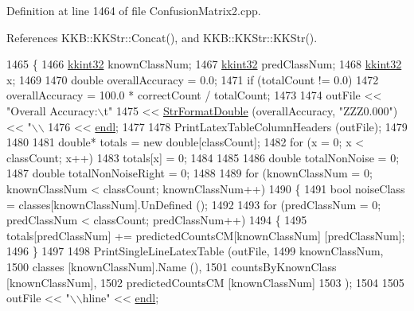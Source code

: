 Definition at line 1464 of file Confusion\+Matrix2.\+cpp.



References K\+K\+B\+::\+K\+K\+Str\+::\+Concat(), and K\+K\+B\+::\+K\+K\+Str\+::\+K\+K\+Str().


\begin{DoxyCode}
1465 \{
1466   \hyperlink{namespace_k_k_b_a8fa4952cc84fda1de4bec1fbdd8d5b1b}{kkint32} knownClassNum;
1467   \hyperlink{namespace_k_k_b_a8fa4952cc84fda1de4bec1fbdd8d5b1b}{kkint32} predClassNum;
1468   \hyperlink{namespace_k_k_b_a8fa4952cc84fda1de4bec1fbdd8d5b1b}{kkint32} x;
1469 
1470   \textcolor{keywordtype}{double}  overallAccuracy = 0.0;
1471   \textcolor{keywordflow}{if}  (totalCount != 0.0)
1472     overallAccuracy = 100.0 * correctCount / totalCount;
1473 
1474   outFile  << \textcolor{stringliteral}{"Overall Accuracy:\(\backslash\)t"} 
1475            << \hyperlink{namespace_k_k_b_a1a40a40e955fa5417a7cdd990e0021b1}{StrFormatDouble} (overallAccuracy, \textcolor{stringliteral}{"ZZZ0.000"}) << \textcolor{stringliteral}{"\(\backslash\)\(\backslash\)%
1476            << \hyperlink{namespace_k_k_b_ad1f50f65af6adc8fa9e6f62d007818a8}{endl};
1477 
1478   PrintLatexTableColumnHeaders (outFile);
1479   
1480 
1481   \textcolor{keywordtype}{double}*  totals = \textcolor{keyword}{new} \textcolor{keywordtype}{double}[classCount];
1482   \textcolor{keywordflow}{for}  (x = 0; x < classCount; x++)
1483     totals[x] = 0;
1484 
1485 
1486   \textcolor{keywordtype}{double}  totalNonNoise = 0;
1487   \textcolor{keywordtype}{double}  totalNonNoiseRight = 0;
1488 
1489   \textcolor{keywordflow}{for}  (knownClassNum = 0;  knownClassNum < classCount;  knownClassNum++)
1490   \{
1491     \textcolor{keywordtype}{bool}  noiseClass = classes[knownClassNum].UnDefined ();
1492 
1493     \textcolor{keywordflow}{for}  (predClassNum = 0; predClassNum < classCount; predClassNum++)
1494     \{
1495       totals[predClassNum] += predictedCountsCM[knownClassNum] [predClassNum];
1496     \}
1497      
1498     PrintSingleLineLatexTable (outFile, 
1499                                knownClassNum,
1500                                classes            [knownClassNum].Name (),
1501                                countsByKnownClass [knownClassNum],
1502                                predictedCountsCM  [knownClassNum]
1503                               );
1504 
1505     outFile << \textcolor{stringliteral}{"\(\backslash\)\(\backslash\)hline"} << \hyperlink{namespace_k_k_b_ad1f50f65af6adc8fa9e6f62d007818a8}{endl};
}
\end{DoxyCode}
